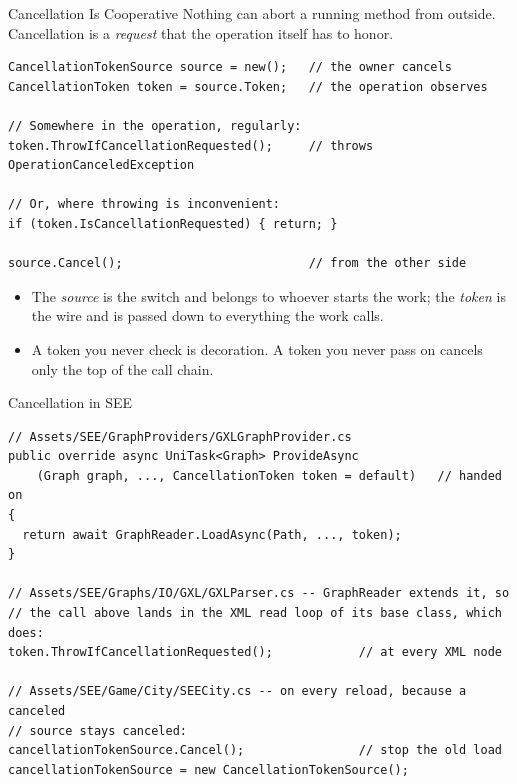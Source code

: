 \begin{frame}[fragile]{Cancellation Is Cooperative}
  Nothing can abort a running method from outside. Cancellation is a
  \emph{request} that the operation itself has to honor.
  \vspace{1ex}

  \begin{lstlisting}[basicstyle=\scriptsize\ttfamily]
CancellationTokenSource source = new();   // the owner cancels
CancellationToken token = source.Token;   // the operation observes

// Somewhere in the operation, regularly:
token.ThrowIfCancellationRequested();     // throws OperationCanceledException

// Or, where throwing is inconvenient:
if (token.IsCancellationRequested) { return; }

source.Cancel();                          // from the other side
  \end{lstlisting}
  \vspace{1ex}

  \begin{itemize}
    \item The \emph{source} is the switch and belongs to whoever starts the
      work; the \emph{token} is the wire and is passed down to everything the
      work calls.
    \item A token you never check is decoration. A token you never pass on
      cancels only the top of the call chain.
  \end{itemize}
\end{frame}

\begin{frame}[fragile]{Cancellation in SEE}
  \begin{lstlisting}[basicstyle=\scriptsize\ttfamily]
// Assets/SEE/GraphProviders/GXLGraphProvider.cs
public override async UniTask<Graph> ProvideAsync
    (Graph graph, ..., CancellationToken token = default)   // handed on
{
  return await GraphReader.LoadAsync(Path, ..., token);
}

// Assets/SEE/Graphs/IO/GXL/GXLParser.cs -- GraphReader extends it, so
// the call above lands in the XML read loop of its base class, which does:
token.ThrowIfCancellationRequested();            // at every XML node

// Assets/SEE/Game/City/SEECity.cs -- on every reload, because a canceled
// source stays canceled:
cancellationTokenSource.Cancel();                // stop the old load
cancellationTokenSource = new CancellationTokenSource();
  \end{lstlisting}
  \vspace{0.5ex}

\end{frame}

